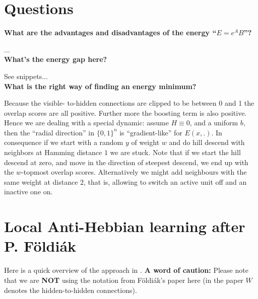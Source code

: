 \documentclass[titlepage]{amsart}
\theoremstyle{definition}
\begin{document}
\section{Questions}
% 
% 
\noindent\textbf{What are the advantages and disadvantages of the energy ``$E=e^A B$''?}
\parskip 5pt

...
\\

\noindent\textbf{What's the energy gap here?}
\parskip 5pt

See snippets...
\\

\noindent\textbf{What is the right way of finding an energy minimum?}
\parskip 5pt

Because the visible- to-hidden connections are clipped to be between 0 and 1 
the overlap scores are all positive. Further more the boosting term is also positive. 
Hence we are dealing with a special dynamic: assume $H \equiv 0$, and a uniform $b$, 
then the “radial direction” in $\{0,1\}^n$  is “gradient-like” for $E(x,.)$. 
In consequence if we start with a random $y$ of weight $w$ and do hill descend 
with neighbors at Hamming distance $1$ we are stuck. Note that if we start the 
hill descend at zero, and move in the direction of steepest descend, we end up 
with the $w$-topmost overlap scores. Alternatively we might add neighbours with 
the same weight at distance $2$, that is, allowing to switch an active unit off 
and an inactive one on.
% 
% 
\section{Local Anti-Hebbian learning after P. F\"oldi\'ak}
% 
% 
Here is a quick overview of the approach in \cite{foldiak}.
\textbf{A word of caution:} Please note that we are \textbf{NOT} using 
the notation from F\"oldi\'ak's paper here (in the paper $W$ denotes the 
hidden-to-hidden connections).
% 
% 
\end{document}
